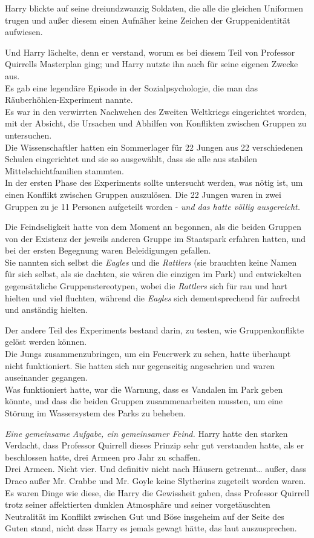 {Harry blickte auf seine dreiundzwanzig Soldaten, die alle die gleichen Uniformen trugen und außer diesem einen Aufnäher keine Zeichen der Gruppenidentität aufwiesen.

Und Harry lächelte, denn er verstand, worum es bei diesem Teil von Professor Quirrells Masterplan ging; und Harry nutzte ihn auch für seine eigenen Zwecke aus.\\ Es gab eine legendäre Episode in der Sozialpsychologie, die man das Räuberhöhlen-Experiment nannte.\\ Es war in den verwirrten Nachwehen des Zweiten Weltkriegs eingerichtet worden, mit der Absicht, die Ursachen und Abhilfen von Konflikten zwischen Gruppen zu untersuchen.\\ Die Wissenschaftler hatten ein Sommerlager für 22 Jungen aus 22 verschiedenen Schulen eingerichtet und sie so ausgewählt, dass sie alle aus stabilen Mittelschichtfamilien stammten.\\ In der ersten Phase des Experiments sollte untersucht werden, was nötig ist, um einen Konflikt zwischen Gruppen auszulösen. Die 22 Jungen waren in zwei Gruppen zu je 11 Personen aufgeteilt worden - \emph{und das hatte völlig ausgereicht.}

Die Feindseligkeit hatte von dem Moment an begonnen, als die beiden Gruppen von der Existenz der jeweils anderen Gruppe im Staatspark erfahren hatten, und bei der ersten Begegnung waren Beleidigungen gefallen.\\ Sie nannten sich selbst die \emph{Eagles} und die \emph{Rattlers} (sie brauchten keine Namen für sich selbst, als sie dachten, sie wären die einzigen im Park) und entwickelten gegensätzliche Gruppenstereotypen, wobei die \emph{Rattlers} sich für rau und hart hielten und viel fluchten, während die \emph{Eagles} sich dementsprechend für aufrecht und anständig hielten.

Der andere Teil des Experiments bestand darin, zu testen, wie Gruppenkonflikte gelöst werden können.\\ Die Jungs zusammenzubringen, um ein Feuerwerk zu sehen, hatte überhaupt nicht funktioniert. Sie hatten sich nur gegenseitig angeschrien und waren auseinander gegangen.\\ Was funktioniert hatte, war die Warnung, dass es Vandalen im Park geben könnte, und dass die beiden Gruppen zusammenarbeiten mussten, um eine Störung im Wassersystem des Parks zu beheben.

\emph{Eine gemeinsame Aufgabe, ein gemeinsamer Feind.} Harry hatte den starken Verdacht, dass Professor Quirrell dieses Prinzip sehr gut verstanden hatte, als er beschlossen hatte, drei Armeen pro Jahr zu schaffen.\\ Drei Armeen. Nicht vier. Und definitiv nicht nach Häusern getrennt… außer, dass Draco außer Mr. Crabbe und Mr. Goyle keine Slytherins zugeteilt worden waren. Es waren Dinge wie diese, die Harry die Gewissheit gaben, dass Professor Quirrell trotz seiner affektierten dunklen Atmosphäre und seiner vorgetäuschten Neutralität im Konflikt zwischen Gut und Böse insgeheim auf der Seite des Guten stand, nicht dass Harry es jemals gewagt hätte, das laut auszusprechen.

}
